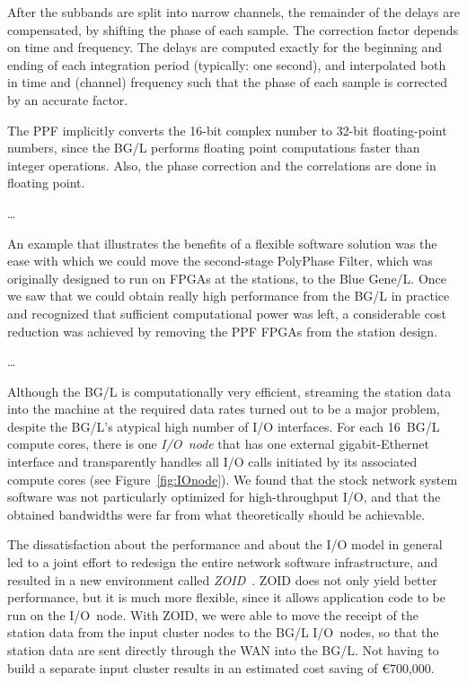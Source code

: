 \documentclass[journal]{IEEEtran}
\begin{document}
After the subbands are split into narrow channels, the remainder of the
delays are compensated, by shifting the phase of each sample.
The correction factor depends on time and frequency.
The delays are computed exactly for the beginning and ending of each
integration period (typically: one second), and interpolated both in time
and (channel) frequency such that the phase of each sample is corrected by
an accurate factor.



The PPF implicitly converts the 16-bit complex number to 32-bit floating-point
numbers, since the BG/L performs floating point computations faster than
integer operations.
Also, the phase correction and the correlations are done in floating point.



\ldots

An example that illustrates the benefits of a flexible software solution was
the ease with which we could move the second-stage PolyPhase Filter, which was
originally designed to run on FPGAs at the stations, to the Blue Gene/L.
Once we saw that we could obtain really high performance from the BG/L in
practice and recognized that sufficient computational power was left,
a considerable cost reduction was achieved by removing the PPF FPGAs from the
station design.

\ldots

Although the BG/L is computationally very efficient,
streaming the station data into the machine at the required data rates
turned out to be a major problem,
despite the BG/L's atypical high number of I/O interfaces.
For each 16~BG/L compute cores, there is one {\em I/O~node\/} that
has one external gigabit-Ethernet interface and transparently handles all I/O
calls initiated by its associated compute cores (see Figure~\ref{fig:IOnode}).
We found that the stock network system software was not particularly optimized
for high-throughput I/O, and that the obtained bandwidths were far from what
theoretically should be achievable.

The dissatisfaction about the performance and about the I/O model in general
led to a joint effort to redesign the entire network software infrastructure,
and resulted in a new environment called {\em ZOID\/}~\cite{Iskra:08}.
ZOID does not only yield better performance, but it is much more flexible,
since it allows application code to be run on the I/O~node.
With ZOID, we were able to move the receipt of the station data from the input
cluster nodes to the BG/L I/O~nodes, so that the station data are sent
directly through the WAN into the BG/L.
Not having to build a separate input cluster results in an estimated cost
saving of \euro700,000.
\end{document}
